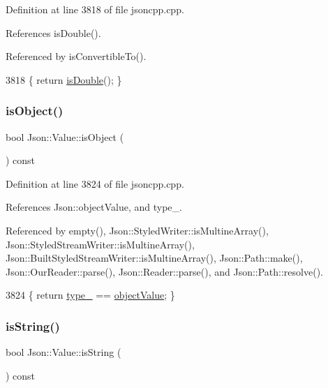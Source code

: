 Definition at line 3818 of file jsoncpp.\+cpp.



References is\+Double().



Referenced by is\+Convertible\+To().


\begin{DoxyCode}
3818 \{ \textcolor{keywordflow}{return} \hyperlink{class_json_1_1_value_a4a2e2a790e19a1c09fc5dd12d7ad47b5}{isDouble}(); \}
\end{DoxyCode}
\mbox{\label{class_json_1_1_value_a8cf96c0f2a552051fcfc78ffee60e037}} 
\subsubsection{\texorpdfstring{is\+Object()}{isObject()}}
{\footnotesize\ttfamily bool Json\+::\+Value\+::is\+Object (\begin{DoxyParamCaption}{ }\end{DoxyParamCaption}) const}



Definition at line 3824 of file jsoncpp.\+cpp.



References Json\+::object\+Value, and type\+\_\+.



Referenced by empty(), Json\+::\+Styled\+Writer\+::is\+Multine\+Array(), Json\+::\+Styled\+Stream\+Writer\+::is\+Multine\+Array(), Json\+::\+Built\+Styled\+Stream\+Writer\+::is\+Multine\+Array(), Json\+::\+Path\+::make(), Json\+::\+Our\+Reader\+::parse(), Json\+::\+Reader\+::parse(), and Json\+::\+Path\+::resolve().


\begin{DoxyCode}
3824 \{ \textcolor{keywordflow}{return} \hyperlink{class_json_1_1_value_abd222c2536dc88bf330dedcd076d2356}{type\_} == \hyperlink{namespace_json_a7d654b75c16a57007925868e38212b4eae8386dcfc36d1ae897745f7b4f77a1f6}{objectValue}; \}
\end{DoxyCode}
\mbox{\label{class_json_1_1_value_a71e1f82cf1c3eaf969d400dcffb163a6}} 
\subsubsection{\texorpdfstring{is\+String()}{isString()}}
{\footnotesize\ttfamily bool Json\+::\+Value\+::is\+String (\begin{DoxyParamCaption}{ }\end{DoxyParamCaption}) const}



